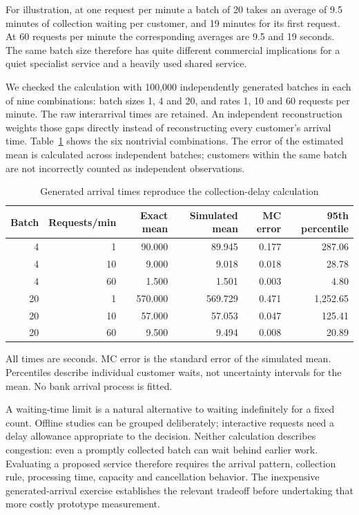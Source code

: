 For illustration, at one request per minute a batch of 20 takes an average
of 9.5 minutes of collection waiting per customer, and 19 minutes for its
first request. At 60 requests per minute the corresponding averages are
9.5 and 19 seconds. The same batch size therefore has quite different
commercial implications for a quiet specialist service and a heavily used
shared service.

We checked the calculation with 100,000 independently generated batches in
each of nine combinations: batch sizes 1, 4 and 20, and rates 1, 10 and
60 requests per minute. The raw interarrival times are retained. An
independent reconstruction weights those gaps directly instead of
reconstructing every customer's arrival time. Table~\ref{closure:batch-results}
shows the six nontrivial combinations. The error of the estimated mean is
calculated across independent batches; customers within the same batch are
not incorrectly counted as independent observations.

\begin{table}[htbp]
\centering\small
\caption{Generated arrival times reproduce the collection-delay calculation}
\label{closure:batch-results}
\begin{tabular}{rrrrrr}
\toprule
Batch & Requests/min & Exact mean & Simulated mean & MC error & 95th percentile\\
\midrule
4&1&90.000&89.945&0.177&287.06\\
4&10&9.000&9.018&0.018&28.78\\
4&60&1.500&1.501&0.003&4.80\\
20&1&570.000&569.729&0.471&1,252.65\\
20&10&57.000&57.053&0.047&125.41\\
20&60&9.500&9.494&0.008&20.89\\
\bottomrule
\end{tabular}
\par\smallskip\footnotesize All times are seconds. MC error is the standard
error of the simulated mean. Percentiles describe individual customer waits,
not uncertainty intervals for the mean. No bank arrival process is fitted.
\end{table}

A waiting-time limit is a natural alternative to waiting indefinitely for a
fixed count. Offline studies can be grouped deliberately; interactive
requests need a delay allowance appropriate to the decision. Neither
calculation describes congestion: even a promptly collected batch can wait
behind earlier work. Evaluating a proposed service therefore requires the
arrival pattern, collection rule, processing time, capacity and cancellation
behavior. The inexpensive generated-arrival exercise establishes the relevant
tradeoff before undertaking that more costly prototype measurement.

